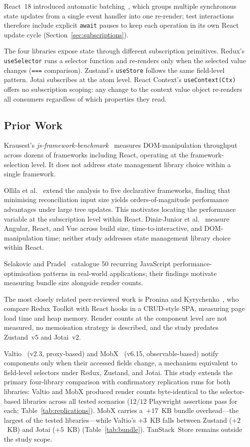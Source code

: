 \documentclass[conference]{IEEEtran}
\newcommand{\code}[1]{\texttt{\small #1}}
\begin{document}
React~18 introduced automatic batching~\cite{b5}, which groups multiple
synchronous state updates from a single event handler into one re-render;
test interactions therefore include explicit \code{await} pauses to keep
each operation in its own React update cycle
(Section~\ref{sec:subscriptions}).

The four libraries expose state through different subscription
primitives. Redux's \code{useSelector} runs a selector function and
re-renders only when the selected value changes (\code{===} comparison).
Zustand's \code{useStore} follows the same field-level pattern. Jotai
subscribes at the atom level. React Context's \code{useContext(Ctx)}
offers no subscription scoping: any change to the context value object
re-renders all consumers regardless of which properties they read.

\subsection{Prior Work}
\label{sec:related}

Krausest's \textit{js-framework-benchmark}~\cite{b6} measures
DOM-manipulation throughput across dozens of frameworks including React,
operating at the framework-selection level. It does not address state
management library choice within a single framework.

Ollila et al.~\cite{b11} extend the analysis to five declarative
frameworks, finding that minimising reconciliation input size yields
orders-of-magnitude performance advantages under large tree updates.
This motivates locating the performance variable at the subscription
level within React. Diniz-Junior et al.~\cite{b12} measure Angular,
React, and Vue across build size, time-to-interactive, and
DOM-manipulation time; neither study addresses state management library
choice within React.

Selakovic and Pradel~\cite{b9} catalogue 50 recurring JavaScript
performance-optimisation patterns in real-world applications; their
findings motivate measuring bundle size alongside render counts.

The most closely related peer-reviewed work is Pronina and
Kyrychenko~\cite{b8}, who compare Redux Toolkit with React hooks in a
CRUD-style SPA, measuring page load time and heap memory. Render counts
at the component level are not measured, no memoisation strategy is
described, and the study predates Zustand~v5 and Jotai~v2.

Valtio~\cite{b16} (v2.3, proxy-based) and MobX~\cite{b17}
(v6.15, observable-based) notify components only when their accessed
fields change, a mechanism equivalent to field-level selectors under
Redux, Zustand, and Jotai.  This study extends the primary
four-library comparison with confirmatory replication runs for both
libraries: Valtio and MobX produced render counts byte-identical to
the selector-based libraries across all tested scenarios
($12/12$ Playwright assertions pass for each;
Table~\ref{tab:replications}).  MobX carries a~$+17$~KB bundle
overhead---the largest of the tested libraries---while Valtio's
$+3$~KB falls between Zustand ($+2$~KB) and Jotai ($+5$~KB)
(Table~\ref{tab:bundle}).  TanStack~Store remains outside the study
scope.
\end{document}
